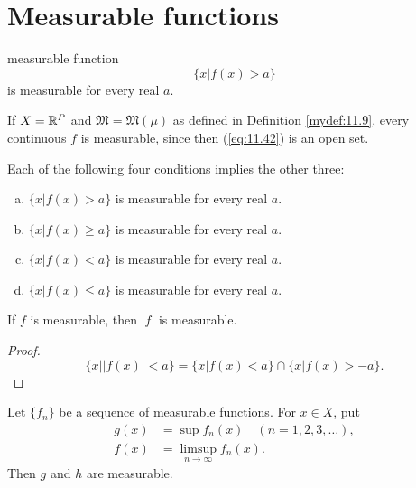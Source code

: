 
\section{Measurable functions}

\begin{mydef}
    \label{mydef:11.13}
    measurable function
    \begin{equation}
        \label{eq:11.42}
        \{x|f(x) > a\}
    \end{equation}
    is measurable for every real $a$.
\end{mydef}

\begin{newexample}
    If $X = {\protect\mathbb R}^P$ and $\mathfrak{M} = \mathfrak{M}(\mu)$ 
    as defined in Definition \ref{mydef:11.9}, every continuous $f$ is measurable, since then (\ref{eq:11.42}) is an open set.
\end{newexample}

\begin{thm}
    \label{thm:11.15}
    Each of the following four conditions implies the other three:
    \begin{enumerate}[(a)]
        \item $\{x|f(x) >    a\}$ is measurable for every real $a$.
        \item $\{x|f(x) \geq a\}$ is measurable for every real $a$.
        \item $\{x|f(x) <    a\}$ is measurable for every real $a$.
        \item $\{x|f(x) \leq a\}$ is measurable for every real $a$.
    \end{enumerate}
\end{thm}

\begin{thm}
    \label{thm:11.16}
    If $f$ is measurable, then $\left| f \right|$ is measurable. 
\end{thm}

\begin{proof}
    \begin{equation*}
        \{x | \left| f(x) \right| < a\} = 
        \{x | f(x) <  a\} \cap 
        \{x | f(x) > -a\} .
    \end{equation*}
\end{proof}

\begin{thm}
    \label{thm:11.17}
    Let $\{f_n\}$ be a sequence of measurable functions. 
    For $x \in X$, put
    \begin{align*}
        g(x) &= \sup f_n(x) \quad (n=1,2,3,\dots), \\
        f(x) &= \limsup_{n \rightarrow \infty} f_n (x) .
    \end{align*}
    Then $g$ and $h$ are measurable.
\end{thm}

